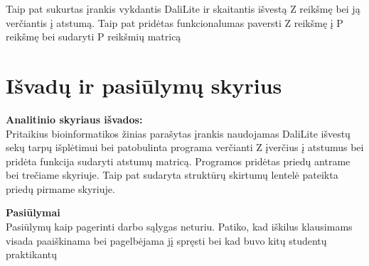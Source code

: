 \documentclass[a4paper,12pt]{article}
\begin{document}
Taip pat sukurtas įrankis vykdantis DaliLite ir skaitantis išvestą Z reikšmę bei ją verčiantis į atstumą. Taip pat pridėtas funkcionalumas paversti Z reikšmę į P reikšmę bei sudaryti P reikšmių matricą

 
\clearpage

\section{Išvadų ir pasiūlymų skyrius}
\hfill


\textbf{Analitinio skyriaus išvados:} \\
Pritaikius bioinformatikos žinias parašytas įrankis naudojamas DaliLite išvestų sekų tarpų išplėtimui bei patobulinta programa verčianti Z įverčius į atstumus bei pridėta funkcija sudaryti atstumų matricą. Programos pridėtas priedų antrame bei trečiame skyriuje. Taip pat sudaryta struktūrų skirtumų lentelė pateikta priedų pirmame skyriuje.\\
\hfill


\textbf{Pasiūlymai} \\
Pasiūlymų kaip pagerinti darbo sąlygas neturiu. Patiko, kad iškilus klausimams visada paaiškinama bei pagelbėjama jį spręsti bei kad buvo kitų studentų praktikantų 

\clearpage
	
\end{document}
